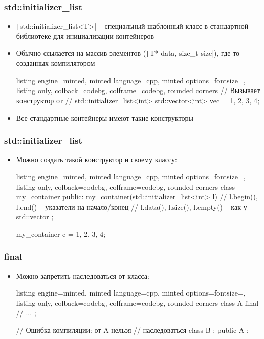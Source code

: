 \documentclass[10pt]{beamer}
\begin{document}
\begin{frame}[fragile]
\frametitle{std::initializer\_list}
\begin{itemize}
\item \texttt|std::initializer_list<T>| -- специальный шаблонный класс в стандартной библиотеке для инициализации контейнеров
\pause
\item Обычно ссылается на массив элементов (\texttt|T* data, size_t size|), где-то созданных компилятором
\pause
{}
\begin{tcblisting}{listing engine=minted, minted language=cpp, minted options={fontsize=\scriptsize}, listing only, colback=codebg, colframe=codebg, rounded corners}
// Вызывает конструктор от
// std::initializer_list<int>
std::vector<int> vec = {1, 2, 3, 4};
\end{tcblisting}
\pause
\item Все стандартные контейнеры имеют такие конструкторы
\end{itemize}
\end{frame}

\begin{frame}[fragile]
\frametitle{std::initializer\_list}
\begin{itemize}
\item Можно создать такой конструктор и своему классу:
\begin{tcblisting}{listing engine=minted, minted language=cpp, minted options={fontsize=\scriptsize}, listing only, colback=codebg, colframe=codebg, rounded corners}
class my_container {
public:
  my_container(std::initializer_list<int> l) {
    // l.begin(), l.end() -- указатели на начало/конец
    // l.data(), l.size(), l.empty() -- как у std::vector
  }
};

my_container c = {1, 2, 3, 4};
\end{tcblisting}
\end{itemize}
\end{frame}

\begin{frame}[fragile]
\frametitle{final}
\begin{itemize}
\item Можно запретить наследоваться от класса:
\begin{tcblisting}{listing engine=minted, minted language=cpp, minted options={fontsize=\scriptsize}, listing only, colback=codebg, colframe=codebg, rounded corners}
class A final {
  // ...
};

// Ошибка компиляции: от A нельзя
// наследоваться
class B : public A {};
\end{tcblisting}
\end{itemize}
\end{frame}
\end{document}
